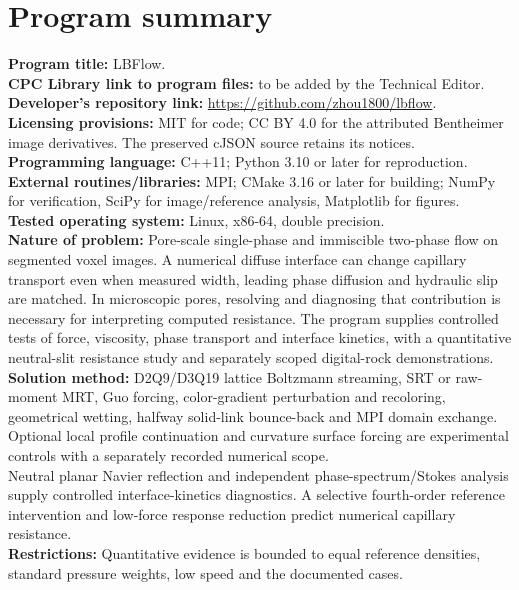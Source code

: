 \section*{Program summary}
\noindent\textbf{Program title:} LBFlow.\\
\textbf{CPC Library link to program files:} to be added by the Technical Editor.\\
\textbf{Developer's repository link:} \url{https://github.com/zhou1800/lbflow}.\\
\textbf{Licensing provisions:} MIT for code; CC BY 4.0 for the attributed
Bentheimer image derivatives. The preserved cJSON source retains its notices.\\
\textbf{Programming language:} C++11; Python 3.10 or later for reproduction.\\
\textbf{External routines/libraries:} MPI; CMake 3.16 or later for building;
NumPy for verification, SciPy for image/reference analysis, Matplotlib for figures.\\
\textbf{Tested operating system:} Linux, x86-64, double precision.\\
\textbf{Nature of problem:} Pore-scale single-phase and immiscible two-phase
flow on segmented voxel images. A numerical diffuse interface can change
capillary transport even when measured width, leading phase diffusion and
hydraulic slip are matched. In microscopic pores, resolving and diagnosing
that contribution is necessary for interpreting computed resistance.
The program supplies controlled tests of force, viscosity, phase transport
and interface kinetics, with a quantitative neutral-slit resistance study
and separately scoped digital-rock demonstrations.\\
\textbf{Solution method:} D2Q9/D3Q19 lattice Boltzmann streaming, SRT or
raw-moment MRT, Guo forcing, color-gradient perturbation and recoloring,
geometrical wetting, halfway solid-link bounce-back and MPI domain exchange.\\
Optional local profile continuation and curvature surface forcing are
experimental controls with a separately recorded numerical scope.\\
Neutral planar Navier reflection and independent phase-spectrum/Stokes
analysis supply controlled interface-kinetics diagnostics.
A selective fourth-order reference intervention and low-force response
reduction predict numerical capillary resistance.\\
\textbf{Restrictions:} Quantitative evidence is bounded to equal reference
densities, standard pressure weights, low speed and the documented cases.
